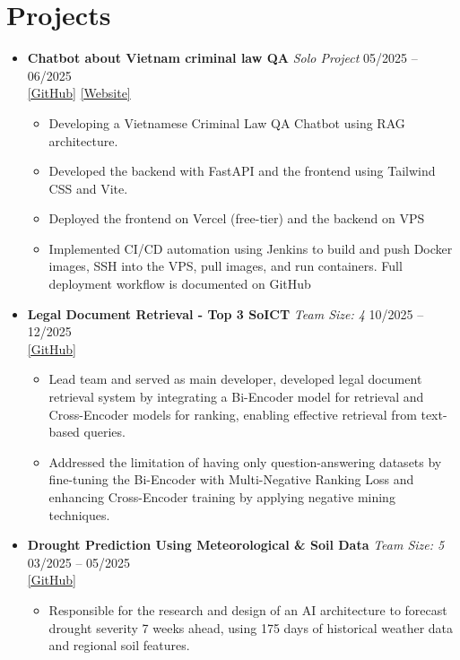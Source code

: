 \documentclass{article}
\begin{document}
\section*{Projects}
\begin{itemize}
    \item \textbf{Chatbot about Vietnam criminal law QA} \hfill \textit{Solo Project} \hfill 05/2025 -- 06/2025 \\
    \href{https://github.com/hoanglvuit/VN-LawBot.git}{[GitHub]} \href{https://vn-law-bot-hoanglvuits-projects.vercel.app/}{[Website]}
    \begin{itemize}
        \item Developing a Vietnamese Criminal Law QA Chatbot using RAG architecture.
        \item Developed the backend with FastAPI and the frontend using Tailwind CSS and Vite.
        \item Deployed the frontend on Vercel (free-tier) and the backend on VPS
        \item Implemented CI/CD automation using Jenkins to build and push Docker images, SSH into the VPS, pull images, and run containers. Full deployment workflow is documented on GitHub
    \end{itemize}
    \item \textbf{Legal Document Retrieval - Top 3 SoICT} \hfill \textit{Team Size: 4} \hfill 10/2025 -- 12/2025 \\
    \href{https://github.com/hoanglvuit/Legal-Document-Retrieval.git}{[GitHub]}
    \begin{itemize}
        \item Lead team and served as main developer, developed legal document retrieval system by integrating a Bi-Encoder model for retrieval and Cross-Encoder models for ranking, enabling effective retrieval from text-based queries.
        \item Addressed the limitation of having only question-answering datasets by fine-tuning the Bi-Encoder with Multi-Negative Ranking Loss and enhancing Cross-Encoder training by applying negative mining techniques.
    \end{itemize}
    \item \textbf{Drought Prediction Using Meteorological \& Soil Data} \hfill \textit{Team Size: 5} \hfill 03/2025 -- 05/2025 \\
    \href{https://github.com/l1aF-2027/Drought-Prediction.git}{[GitHub]}
    \begin{itemize}
        \item Responsible for the research and design of an AI architecture to forecast drought severity 7 weeks ahead, using 175 days of historical weather data and regional soil features.

\end{itemize}
\end{itemize}
\end{document}
